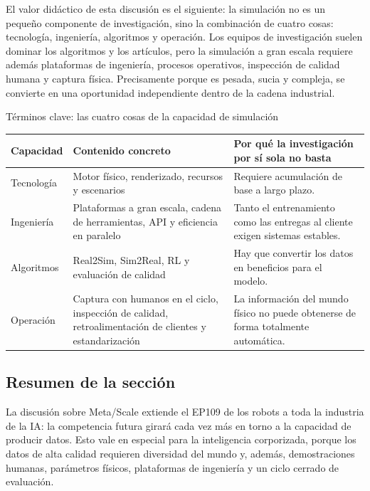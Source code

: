 El valor didáctico de esta discusión es el siguiente: la simulación no es un pequeño componente de investigación, sino la combinación de cuatro cosas: tecnología, ingeniería, algoritmos y operación. Los equipos de investigación suelen dominar los algoritmos y los artículos, pero la simulación a gran escala requiere además plataformas de ingeniería, procesos operativos, inspección de calidad humana y captura física. Precisamente porque es pesada, sucia y compleja, se convierte en una oportunidad independiente dentro de la cadena industrial.

\begin{knowledgebox}{Términos clave: las cuatro cosas de la capacidad de simulación}
\begin{tabularx}{\textwidth}{p{}p{}X}
\toprule
Capacidad & Contenido concreto & Por qué la investigación por sí sola no basta \\
\midrule
Tecnología & Motor físico, renderizado, recursos y escenarios & Requiere acumulación de base a largo plazo. \\
Ingeniería & Plataformas a gran escala, cadena de herramientas, API y eficiencia en paralelo & Tanto el entrenamiento como las entregas al cliente exigen sistemas estables. \\
Algoritmos & Real2Sim, Sim2Real, RL y evaluación de calidad & Hay que convertir los datos en beneficios para el modelo. \\
Operación & Captura con humanos en el ciclo, inspección de calidad, retroalimentación de clientes y estandarización & La información del mundo físico no puede obtenerse de forma totalmente automática. \\
\bottomrule
\end{tabularx}
\end{knowledgebox}

\subsection{Resumen de la sección}

La discusión sobre Meta/Scale extiende el EP109 de los robots a toda la industria de la IA: la competencia futura girará cada vez más en torno a la capacidad de producir datos. Esto vale en especial para la inteligencia corporizada, porque los datos de alta calidad requieren diversidad del mundo y, además, demostraciones humanas, parámetros físicos, plataformas de ingeniería y un ciclo cerrado de evaluación.
